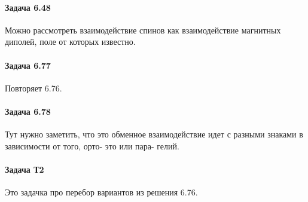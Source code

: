 \documentclass[12pt]{article}
\begin{document}
\paragraph{Задача 6.48} Можно рассмотреть взаимодействие спинов как взаимодействие магнитных диполей, поле от которых известно.
\paragraph{Задача 6.77} Повторяет 6.76.
\paragraph{Задача 6.78} Тут нужно заметить, что это обменное взаимодействие идет с разными знаками в зависимости от того, орто- это или пара- гелий.
\paragraph{Задача Т2} Это задачка про перебор вариантов из решения 6.76.
\end{document}
